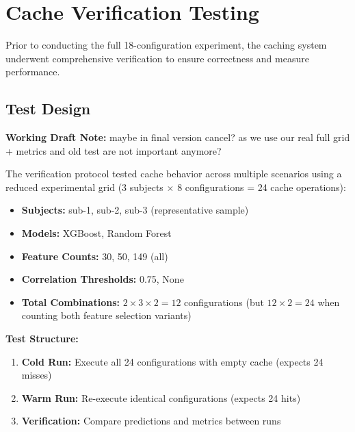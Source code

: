 \documentclass{imc-inf} %
\begin{document}
\section{Cache Verification Testing}
\label{sec:verification}

Prior to conducting the full 18-configuration experiment, the caching system 
underwent comprehensive verification to ensure correctness and measure performance.

\subsection{Test Design}


\begin{center}
\colorbox{yellow!20}{%
\begin{minipage}{0.9\textwidth}
\textbf{Working Draft Note:} 
maybe in final version cancel? as we use our real full grid + metrics and old test are not important anymore?
\end{minipage}
}
\end{center}

The verification protocol tested cache behavior across multiple scenarios using 
a reduced experimental grid (3 subjects $\times$ 8 configurations = 24 cache 
operations):

\begin{itemize}
\item \textbf{Subjects:} sub-1, sub-2, sub-3 (representative sample)
\item \textbf{Models:} XGBoost, Random Forest
\item \textbf{Feature Counts:} 30, 50, 149 (all)
\item \textbf{Correlation Thresholds:} 0.75, None
\item \textbf{Total Combinations:} $2 \times 3 \times 2 = 12$ configurations 
      (but $12 \times 2 = 24$ when counting both feature selection variants)
\end{itemize}

\textbf{Test Structure:}
\begin{enumerate}
\item \textbf{Cold Run:} Execute all 24 configurations with empty cache (expects 24 misses)
\item \textbf{Warm Run:} Re-execute identical configurations (expects 24 hits)
\item \textbf{Verification:} Compare predictions and metrics between runs
\end{enumerate}
\end{document}
